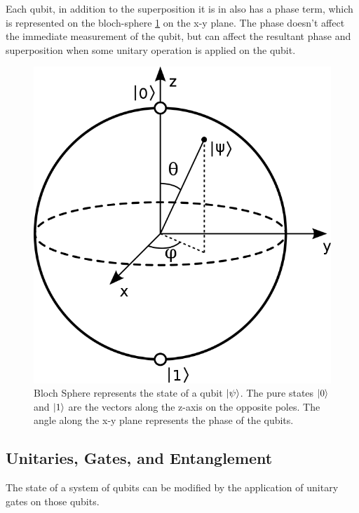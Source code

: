 Each qubit, in addition to the superposition it is in also has a phase term, which is represented on the bloch-sphere \ref{fig:bloch-sphere} on the x-y plane. The phase doesn't affect the immediate measurement of the qubit, but can affect the resultant phase and superposition when some unitary operation is applied on the qubit.

\begin{figure}[H]
    \centering
    \includegraphics[width=0.5\linewidth]{figures/quantum/bloch_sphere.png}
    \caption{Bloch Sphere represents the state of a qubit $\ket{\psi}$. The pure states $\ket{0}$ and $\ket{1}$ are the vectors along the z-axis on the opposite poles. The angle along the x-y plane represents the phase of the qubits.}
    \label{fig:bloch-sphere}
\end{figure}


\subsection{Unitaries, Gates, and Entanglement}
\label{sec:background-unitary-gate-entanglement}

The state of a system of qubits can be modified by the application of unitary gates on those qubits.

